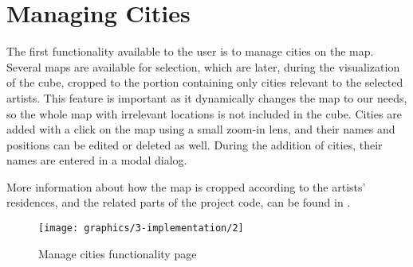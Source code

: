 \section{Managing Cities}\label{sec:managing-cities}
The first functionality available to the user is to manage cities on the map. Several maps are available for selection, which are later, during the
visualization of the cube, cropped to the portion containing only cities relevant to the selected artists. This feature is important as it
dynamically changes the map to our needs, so the whole map with irrelevant locations is not included in the cube. Cities are added with a click on
the map using a small zoom-in lens, and their names and positions can be edited or deleted as well. During the addition of cities, their names are
entered in a modal dialog.

More information about how the map is cropped according to the artists’ residences, and the related parts of the project code, can be found in
.

\begin{figure}[hbt!]
    \begin{center}
        \texttt{[image: graphics/3-implementation/2]}
    \end{center}
    \caption{Manage cities functionality page}
    \label{fig:figure3.2}
\end{figure}

\clearpage